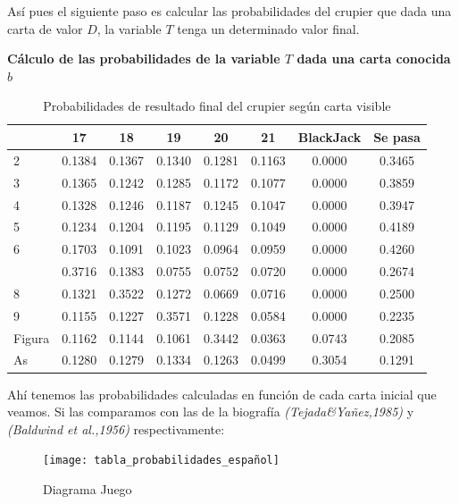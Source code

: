 \documentclass[12pt,a4paper,]{book}
\numberwithin{dummy}{section}
\theoremstyle{ocrenumbox}
\theoremstyle{blacknumex}
\theoremstyle{blacknumbox}
\theoremstyle{ocrenum}
\theoremstyle{ocrenum}
\begin{document}
Así pues el siguiente paso es calcular las probabilidades del crupier
que dada una carta de valor \(D\), la variable \(T\) tenga un
determinado valor final.

\textbf{Cálculo de las probabilidades de la variable \(T\) dada una
carta conocida \(b\)}

\begingroup\fontsize{12}{14}\selectfont

\begin{longtable}[t]{lccccccc}
\caption{\label{tab:unnamed-chunk-3}Probabilidades de resultado final del crupier según carta visible}\\
\toprule
 & 17 & 18 & 19 & 20 & 21 & BlackJack & Se pasa\\
\midrule
2 & 0.1384 & 0.1367 & 0.1340 & 0.1281 & 0.1163 & 0.0000 & 0.3465\\
3 & 0.1365 & 0.1242 & 0.1285 & 0.1172 & 0.1077 & 0.0000 & 0.3859\\
4 & 0.1328 & 0.1246 & 0.1187 & 0.1245 & 0.1047 & 0.0000 & 0.3947\\
5 & 0.1234 & 0.1204 & 0.1195 & 0.1129 & 0.1049 & 0.0000 & 0.4189\\
6 & 0.1703 & 0.1091 & 0.1023 & 0.0964 & 0.0959 & 0.0000 & 0.4260\\
\addlinespace
7 & 0.3716 & 0.1383 & 0.0755 & 0.0752 & 0.0720 & 0.0000 & 0.2674\\
8 & 0.1321 & 0.3522 & 0.1272 & 0.0669 & 0.0716 & 0.0000 & 0.2500\\
9 & 0.1155 & 0.1227 & 0.3571 & 0.1228 & 0.0584 & 0.0000 & 0.2235\\
Figura & 0.1162 & 0.1144 & 0.1061 & 0.3442 & 0.0363 & 0.0743 & 0.2085\\
As & 0.1280 & 0.1279 & 0.1334 & 0.1263 & 0.0499 & 0.3054 & 0.1291\\
\bottomrule
\end{longtable}
\endgroup{}

Ahí tenemos las probabilidades calculadas en función de cada carta
inicial que veamos. Si las comparamos con las de la biografía
\emph{(Tejada\&Yañez,1985)}\citep{Libro16} y \emph{(Baldwind et
al.,1956)}\citep{Libro14} respectivamente:

\begin{figure}[H]

{\centering \texttt{[image: tabla\_probabilidades\_español]} 

}

\caption{\label{forma_extensiva}Diagrama Juego}\label{fig:español_blackjack}
\end{figure}
\end{document}
